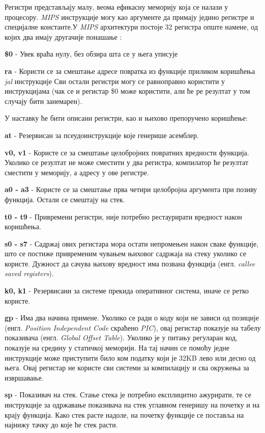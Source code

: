 \documentclass[12pt,oneside]{memoir}
\begin{document}
Регистри представљају малу, веома ефикасну меморију која се налази у процесору. \textit{MIPS} инструкције могу као
аргументе да примају једино регистре и специјалне константе.У \textit{MIPS} архитектури постоје 32 регистра опште
намене, од којих два имају другачије понашање \cite{SMR}:

\textbf{\$0} - Увек враћа нулу, без обзира шта се у њега уписује

\textbf{ra} - Користи се за смештање адресе повратка из функције приликом коришћења \textit{jal}
инструкције
Сви остали регистри могу се равноправно користити у инструкцијама (чак се и регистар \$0 може користити, али ће ре
резултат у том случају бити занемарен).

У наставку ће бити описани регистри, као и њихово препоручено коришћење:

\textbf{at} - Резервисан за псеудоинструкције које генерише асемблер.

\textbf{v0, v1} - Користе се за смештање целобројних повратних вредности функција. Уколико се резултат не може
сместити у два регистра, компилатор ће резултат сместити у меморију, а адресу у ове регистре.

\textbf{a0 - a3} - Користе се за смештање прва четири целобројна аргумента при позиву функција. Остали се смештају
на стек.

\textbf{t0 - t9} - Привремени регистри, није потребно рестаурирати вредност након коришћења.

\textbf{s0 - s7} - Садржај ових регистара мора остати непромењен након сваке функције, што се постиже привременим
чувањем њиховог садржаја на стеку уколико се користе. Дужност да сачува њихову вредност има позвана функција (енгл.
\textit{callee saved registers}).

\textbf{k0, k1} - Резервисани за системе прекида оперативног система, иначе се ретко користе.

\textbf{gp} - Има два начина примене. Уколико се ради о коду који не зависи од позиције (енгл. \textit{Position
Independent Code} скраћено \textit{PIC}), овај регистар показује на табелу показивача (енгл. \textit{Global Offset
Table}). Уколико је у питању регуларан код, показује на средину у статичкој меморији. На тај начин се помоћу једне
инструкције може приступити било ком податку који је 32KB лево или десно од њега. Овај регистар не користе сви
системи за компилацију и сва окружења за извршавање.

\textbf{sp} - Показивач на стек. Стање стека је потребно експлицитно ажурирати, те се инструкције за одржавање
показивача на стек углавном генеришу на почетку и на крају функција. Како стек расте надоле, на почетку функције се
поставља на најнижу тачку до које ће стек расти.
\end{document}
